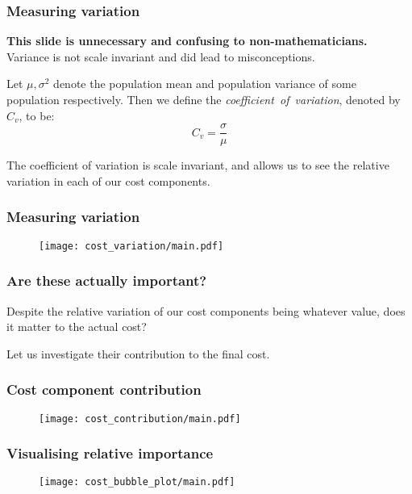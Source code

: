 \begin{frame}
    \frametitle{Measuring variation}
    \textbf{This slide is unnecessary and confusing to non-mathematicians.}
    Variance is not scale invariant and did lead to misconceptions.

    \pause%
    \vspace{10pt}
    \begin{definition}
        Let \(\mu, \sigma^2\) denote the population mean and population variance
        of some population respectively. Then we define the
        \emph{coefficient~of~variation}, denoted by \(C_v\), to be:
        \[
            C_v = \frac{\sigma}{\mu}
        \]
    \end{definition}

    \pause%
    The coefficient of variation is scale invariant, and allows us to see the
    relative variation in each of our cost components.
\end{frame}

\begin{frame}
    \frametitle{Measuring variation}

    \begin{figure}
    \texttt{[image: cost\_variation/main.pdf]}
    \end{figure}
\end{frame}

\begin{frame}
    \frametitle{Are these actually important?}

    Despite the relative variation of our cost components being whatever value,
    does it matter to the actual cost?

    \vspace{10pt}
    Let us investigate their contribution to the final cost.
\end{frame}

\begin{frame}
    \frametitle{Cost component contribution}

    \begin{figure}
    \texttt{[image: cost\_contribution/main.pdf]}
    \end{figure}
\end{frame}

\begin{frame}
    \frametitle{Visualising relative importance}

    \begin{figure}
    \texttt{[image: cost\_bubble\_plot/main.pdf]}
    \end{figure}
\end{frame}
